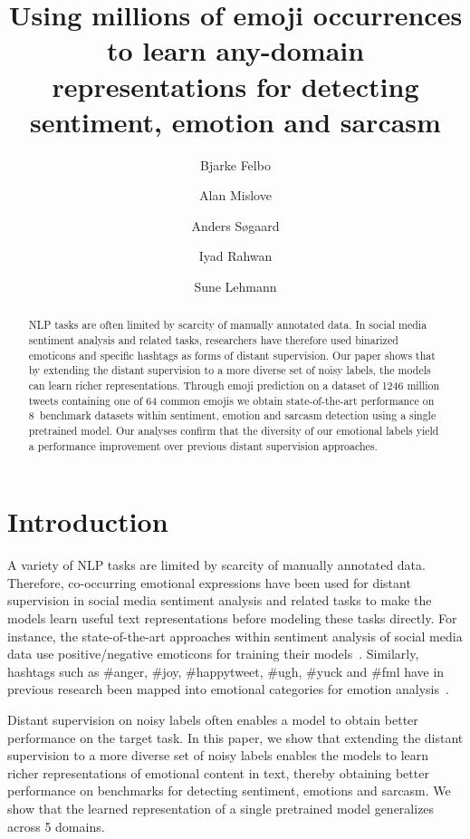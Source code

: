 \documentclass[11pt,a4paper]{article}
\title{Using millions of emoji occurrences to learn any-domain representations for detecting sentiment, emotion and sarcasm}
\author[1]{Bjarke Felbo}
\author[2]{Alan Mislove}
\author[3]{Anders S{\o}gaard}
\author[1]{Iyad Rahwan}
\author[4]{Sune Lehmann}
\affil[1]{Media Lab, Massachusetts Institute of Technology}
\affil[2]{College of Computer and Information Science, Northeastern University}
\affil[3]{Department of Computer Science, University of Copenhagen}
\affil[4]{DTU Compute, Technical University of Denmark}
\date{}
\newcommand{\ndsets}{8}
\newcommand{\ndomains}{5}
\begin{document}
\maketitle
\begin{abstract}

NLP tasks are often limited by scarcity of manually annotated data. In social media sentiment analysis and related tasks, researchers have therefore used binarized emoticons and specific hashtags as forms of distant supervision. Our paper shows that by extending the distant supervision to a more diverse set of noisy labels, the models can learn richer representations. Through emoji prediction on a dataset of 1246 million tweets containing one of 64 common emojis we obtain state-of-the-art performance on \ndsets{}~benchmark datasets within sentiment, emotion and sarcasm detection using a single pretrained model. Our analyses confirm that the diversity of our emotional labels yield a performance improvement over previous distant supervision approaches.

\end{abstract}

\section{Introduction}
\label{sec:introduction}

A variety of NLP tasks are limited by scarcity of manually annotated data. Therefore, co-occurring emotional expressions have been used for distant supervision in social media sentiment analysis and related tasks to make the models learn useful text representations before modeling these tasks directly. For instance, the state-of-the-art approaches within sentiment analysis of social media data use positive/negative emoticons for training their models~\cite{deriu2016swisscheese, tang2014learning}. Similarly, hashtags such as \#anger, \#joy, \#happytweet, \#ugh, \#yuck and \#fml have in previous research been mapped into emotional categories for emotion analysis~\cite{mohammad2012emotional}.

Distant supervision on noisy labels often enables a model to obtain better performance on the target task. In this paper, we show that extending the distant supervision to a more diverse set of noisy labels enables the models to learn richer representations of emotional content in text, thereby obtaining better performance on benchmarks for detecting sentiment, emotions and sarcasm. We show that the learned representation of a single pretrained model generalizes across \ndomains{} domains.
\end{document}
